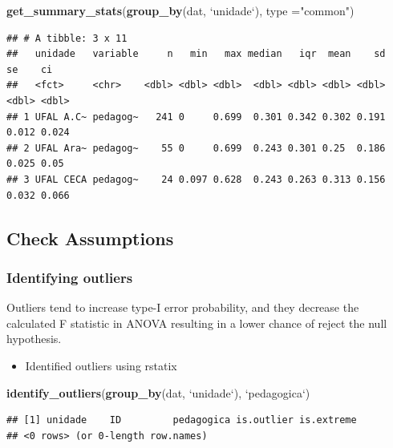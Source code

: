 \documentclass[]{article}
\newenvironment{Shaded}{\begin{snugshade}}{\end{snugshade}}
\newcommand{\DataTypeTok}[1]{\textcolor[rgb]{0.13,0.29,0.53}{#1}}
\newcommand{\KeywordTok}[1]{\textcolor[rgb]{0.13,0.29,0.53}{\textbf{#1}}}
\newcommand{\NormalTok}[1]{#1}
\newcommand{\StringTok}[1]{\textcolor[rgb]{0.31,0.60,0.02}{#1}}
\providecommand{\tightlist}{%
  \setlength{\itemsep}{0pt}\setlength{\parskip}{0pt}}
\begin{document}
\begin{Shaded}
\begin{Highlighting}[]
\KeywordTok{get_summary_stats}\NormalTok{(}\KeywordTok{group_by}\NormalTok{(dat, }\StringTok{`}\DataTypeTok{unidade}\StringTok{`}\NormalTok{), }\DataTypeTok{type =}\StringTok{"common"}\NormalTok{)}
\end{Highlighting}
\end{Shaded}

\begin{verbatim}
## # A tibble: 3 x 11
##   unidade   variable     n   min   max median   iqr  mean    sd    se    ci
##   <fct>     <chr>    <dbl> <dbl> <dbl>  <dbl> <dbl> <dbl> <dbl> <dbl> <dbl>
## 1 UFAL A.C~ pedagog~   241 0     0.699  0.301 0.342 0.302 0.191 0.012 0.024
## 2 UFAL Ara~ pedagog~    55 0     0.699  0.243 0.301 0.25  0.186 0.025 0.05 
## 3 UFAL CECA pedagog~    24 0.097 0.628  0.243 0.263 0.313 0.156 0.032 0.066
\end{verbatim}

\hypertarget{check-assumptions}{%
\subsection{Check Assumptions}\label{check-assumptions}}

\hypertarget{identifying-outliers}{%
\subsubsection{Identifying outliers}\label{identifying-outliers}}

Outliers tend to increase type-I error probability, and they decrease
the calculated F statistic in ANOVA resulting in a lower chance of
reject the null hypothesis.

\begin{itemize}
\tightlist
\item
  Identified outliers using rstatix
\end{itemize}

\begin{Shaded}
\begin{Highlighting}[]
\KeywordTok{identify_outliers}\NormalTok{(}\KeywordTok{group_by}\NormalTok{(dat, }\StringTok{`}\DataTypeTok{unidade}\StringTok{`}\NormalTok{), }\StringTok{`}\DataTypeTok{pedagogica}\StringTok{`}\NormalTok{)}
\end{Highlighting}
\end{Shaded}

\begin{verbatim}
## [1] unidade    ID         pedagogica is.outlier is.extreme
## <0 rows> (or 0-length row.names)
\end{verbatim}
\end{document}
